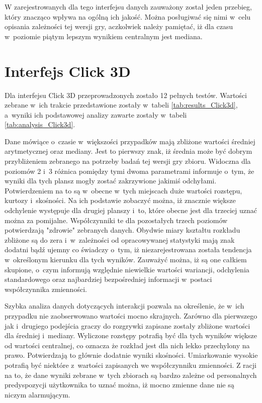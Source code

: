 \documentclass[a4paper,12pt,numbers=noenddot]{report}
\begin{document}
W zarejestrowanych dla tego interfejsu danych zauważony został jeden przebieg, który znacząco wpływa na ogólną ich jakość. Można posługiwać się nimi w~celu opisania zależności tej wersji gry, aczkolwiek należy pamiętać, iż dla czasu w~poziomie piątym lepszym wynikiem centralnym jest mediana.


\section{Interfejs Click 3D}%
Dla interfejsu Click 3D przeprowadzonych zostało 12 pełnych testów. Wartości zebrane w~ich trakcie przedstawione zostały w~tabeli \ref{tab:results_Click3d}, a~wyniki ich podstawowej analizy zawarte zostały w~tabeli \ref{tab:analysis_Click3d}.

Dane mówiące o~czasie w~większości przypadków mają zbliżone wartości średniej arytmetycznej oraz mediany. Jest to pierwszy znak, iż średnia może być dobrym przybliżeniem zebranego na potrzeby badań tej wersji gry zbioru. Widoczna dla poziomów 2 i~3 różnica pomiędzy tymi dwoma parametrami informuje o~tym, że wyniki dla tych plansz mogły zostać zakrzywione jakimiś odchyłami. Potwierdzeniem na to są w~obecne w~tych miejscach duże wartości rozstępu, kurtozy i~skośności. Na ich podstawie zobaczyć można, iż znacznie większe odchylenie występuje dla drugiej planszy i~to, które obecne jest dla trzeciej uznać można za pomijalne. Współczynniki te dla pozostałych trzech poziomów potwierdzają "zdrowie" zebranych danych. Obydwie miary kształtu rozkładu zbliżone są do zera i~w~zależności od opracowywanej statystyki mają znak dodatni bądź ujemny co świadczy o~tym, iż niezarejestrowana została tendencja w~określonym kierunku dla tych wyników. Zauważyć można, iż są one całkiem skupione, o~czym informują względnie niewielkie wartości wariancji, odchylenia standardowego oraz najbardziej bezpośredniej informacji w~postaci współczynnika zmienności.

Szybka analiza danych dotyczących interakcji pozwala na określenie, że w~ich przypadku nie zaobserwowano wartości mocno skrajnych. Zarówno dla pierwszego jak i~drugiego podejścia graczy do rozgrywki zapisane zostały zbliżone wartości dla średniej i~mediany. Wyliczone rozstępy potrafią być dla tych wyników większe od wartości centralnej, co oznacza że rozkład jest dla nich lekko przechylony na prawo. Potwierdzają to głównie dodatnie wyniki skośności. Umiarkowanie wysokie potrafią być niektóre z~wartości zapisanych we współczynniku zmienności. Z racji na to, że dane wyniki zebrane w~tych zbiorach są bardzo zależne od personalnych predyspozycji użytkownika to uznać można, iż mocno zmienne dane nie są niczym alarmującym.\\
\end{document}
